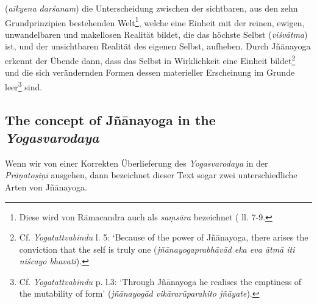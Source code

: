 (\textit{aikyena darśanam}) die Unterscheidung zwischen der sichtbaren, aus den zehn Grundprinzipien bestehenden Welt\footnote{Diese wird von Rāmacandra auch als \textit{saṃsāra} bezeichnet ( ll. 7-9.}, welche eine Einheit mit der reinen, ewigen, unwandelbaren und makellosen Realität bildet, die das höchste Selbst (\textit{viśvātma}) ist, und der unsichtbaren Realität des eigenen Selbst, aufheben. Durch Jñānayoga erkennt der Übende dann, dass das Selbst in Wirklichkeit eine Einheit bildet\footnote{Cf. \textit{Yogatattvabindu}  \pageref{svabhava1} l. 5: `Because of the power of Jñānayoga, there arises the conviction that the self is truly one (\textit{jñānayogaprabhāvād eka eva ātmā iti niścayo bhavati}).} und die sich verändernden Formen dessen materieller Erscheinung im Grunde leer\footnote{Cf. \textit{Yogatattvabindu}  p.\pageref{svabhava2} l.3: `Through Jñānayoga he realises the emptiness of the mutability of form' (\textit{jñānayogād vikārarūparahito jñāyate}).} sind.

\subsection{The concept of Jñānayoga in the \textit{Yogasvarodaya}}

Wenn wir von einer Korrekten Überlieferung des \textit{Yogasvarodaya} in der \textit{Prāṇatoṣiṇī} ausgehen, dann bezeichnet dieser Text sogar zwei unterschiedliche Arten von Jñānayoga. 


